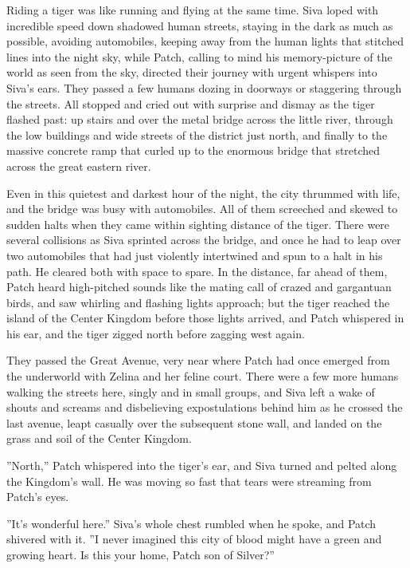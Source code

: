 \documentclass[12pt]{book}
\begin{document}
 Riding a tiger was like running and flying at the same time. Siva loped with incredible speed down shadowed human streets, staying in the dark as much as possible, avoiding automobiles, keeping away from the human lights that stitched lines into the night sky, while Patch, calling to mind his memory-picture of the world as seen from the sky, directed their journey with urgent whispers into Siva's ears. They passed a few humans dozing in doorways or staggering through the streets. All stopped and cried out with surprise and dismay as the tiger flashed past: up stairs and over the metal bridge across the little river, through the low buildings and wide streets of the district just north, and finally to the massive concrete ramp that curled up to the enormous bridge that stretched across the great eastern river.\par
 Even in this quietest and darkest hour of the night, the city thrummed with life, and the bridge was busy with automobiles. All of them screeched and skewed to sudden halts when they came within sighting distance of the tiger. There were several collisions as Siva sprinted across the bridge, and once he had to leap over two automobiles that had just violently intertwined and spun to a halt in his path. He cleared both with space to spare. In the distance, far ahead of them, Patch heard high-pitched sounds like the mating call of crazed and gargantuan birds, and saw whirling and flashing lights approach; but the tiger reached the island of the Center Kingdom before those lights arrived, and Patch whispered in his ear, and the tiger zigged north before zagging west again.\par
 They passed the Great Avenue, very near where Patch had once emerged from the underworld with Zelina and her feline court. There were a few more humans walking the streets here, singly and in small groups, and Siva left a wake of shouts and screams and disbelieving expostulations behind him as he crossed the last avenue, leapt casually over the subsequent stone wall, and landed on the grass and soil of the Center Kingdom.\par
 ''North,'' Patch whispered into the tiger's ear, and Siva turned and pelted along the Kingdom's wall. He was moving so fast that tears were streaming from Patch's eyes.\par
 ''It's wonderful here.'' Siva's whole chest rumbled when he spoke, and Patch shivered with it. ''I never imagined this city of blood might have a green and growing heart. Is this your home, Patch son of Silver?''\par
\end{document}
